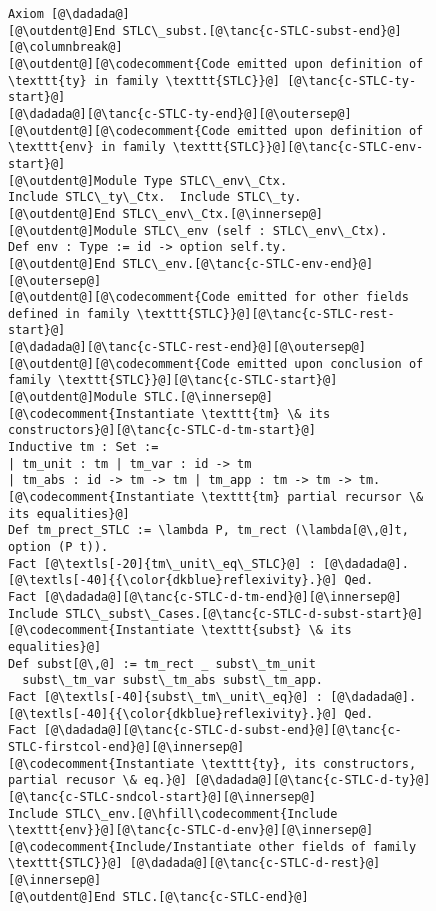\begin{figure}
\begin{minipage}{\textwidth}
\begin{multicols}{2}
\begin{lstlisting}
Axiom [@\dadada@]
[@\outdent@]End STLC\_subst.[@\tanc{c-STLC-subst-end}@][@\columnbreak@]
[@\outdent@][@\codecomment{Code emitted upon definition of \texttt{ty} in family \texttt{STLC}}@] [@\tanc{c-STLC-ty-start}@]
[@\dadada@][@\tanc{c-STLC-ty-end}@][@\outersep@]
[@\outdent@][@\codecomment{Code emitted upon definition of \texttt{env} in family \texttt{STLC}}@][@\tanc{c-STLC-env-start}@]
[@\outdent@]Module Type STLC\_env\_Ctx.
Include STLC\_ty\_Ctx.  Include STLC\_ty.
[@\outdent@]End STLC\_env\_Ctx.[@\innersep@]
[@\outdent@]Module STLC\_env (self : STLC\_env\_Ctx).
Def env : Type := id -> option self.ty.
[@\outdent@]End STLC\_env.[@\tanc{c-STLC-env-end}@][@\outersep@]
[@\outdent@][@\codecomment{Code emitted for other fields defined in family \texttt{STLC}}@][@\tanc{c-STLC-rest-start}@]
[@\dadada@][@\tanc{c-STLC-rest-end}@][@\outersep@]
[@\outdent@][@\codecomment{Code emitted upon conclusion of family \texttt{STLC}}@][@\tanc{c-STLC-start}@]
[@\outdent@]Module STLC.[@\innersep@]
[@\codecomment{Instantiate \texttt{tm} \& its constructors}@][@\tanc{c-STLC-d-tm-start}@]
Inductive tm : Set :=
| tm_unit : tm | tm_var : id -> tm
| tm_abs : id -> tm -> tm | tm_app : tm -> tm -> tm.
[@\codecomment{Instantiate \texttt{tm} partial recursor \& its equalities}@]
Def tm_prect_STLC := \lambda P, tm_rect (\lambda[@\,@]t, option (P t)).
Fact [@\textls[-20]{tm\_unit\_eq\_STLC}@] : [@\dadada@]. [@\textls[-40]{{\color{dkblue}reflexivity}.}@] Qed.
Fact [@\dadada@][@\tanc{c-STLC-d-tm-end}@][@\innersep@]
Include STLC\_subst\_Cases.[@\tanc{c-STLC-d-subst-start}@]
[@\codecomment{Instantiate \texttt{subst} \& its equalities}@]
Def subst[@\,@] := tm_rect _ subst\_tm_unit
  subst\_tm_var subst\_tm_abs subst\_tm_app.
Fact [@\textls[-40]{subst\_tm\_unit\_eq}@] : [@\dadada@]. [@\textls[-40]{{\color{dkblue}reflexivity}.}@] Qed.
Fact [@\dadada@][@\tanc{c-STLC-d-subst-end}@][@\tanc{c-STLC-firstcol-end}@][@\innersep@]
[@\codecomment{Instantiate \texttt{ty}, its constructors, partial recusor \& eq.}@] [@\dadada@][@\tanc{c-STLC-d-ty}@][@\tanc{c-STLC-sndcol-start}@][@\innersep@]
Include STLC\_env.[@\hfill\codecomment{Include \texttt{env}}@][@\tanc{c-STLC-d-env}@][@\innersep@]
[@\codecomment{Include/Instantiate other fields of family \texttt{STLC}}@] [@\dadada@][@\tanc{c-STLC-d-rest}@][@\innersep@]
[@\outdent@]End STLC.[@\tanc{c-STLC-end}@]
\end{lstlisting}


\end{multicols}
\end{minipage}
\end{figure}
